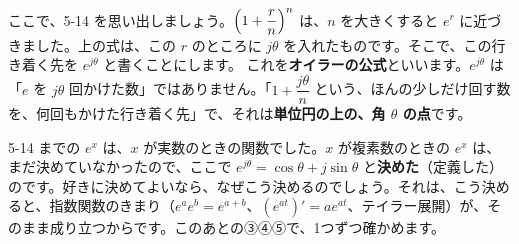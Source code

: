 ここで、5-14 を思い出しましょう。$\Bigl(1+\dfrac{r}{n}\Bigr)^n$ は、$n$ を大きくすると $e^r$ に近づきました。上の式は、この $r$ のところに $j\theta$ を入れたものです。そこで、この行き着く先を $e^{j\theta}$ と書くことにします。
これを\textbf{オイラーの公式}といいます。$e^{j\theta}$ は「$e$ を $j\theta$ 回かけた数」ではありません。「$1+\dfrac{j\theta}{n}$ という、ほんの少しだけ回す数を、何回もかけた行き着く先」で、それは\textbf{単位円の上の、角 $\theta$ の点}です。

\begin{seikaku}
5-14 までの $e^x$ は、$x$ が実数のときの関数でした。$x$ が複素数のときの $e^x$ は、まだ決めていなかったので、ここで $e^{j\theta}=\cos\theta+j\sin\theta$ と\textbf{決めた}（定義した）のです。好きに決めてよいなら、なぜこう決めるのでしょう。それは、こう決めると、指数関数のきまり（$e^ae^b=e^{a+b}$、$(e^{at})'=ae^{at}$、テイラー展開）が、そのまま成り立つからです。このあとの③④⑤で、1つずつ確かめます。
\end{seikaku}


